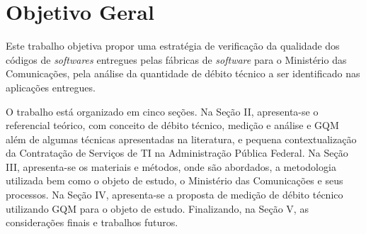 \section{Objetivo Geral}
 Este trabalho objetiva propor uma estratégia de verificação da qualidade dos
 códigos de \textit{softwares} entregues pelas fábricas de \textit{software} para o Ministério
 das Comunicações, pela análise da quantidade de débito técnico a ser identificado
 nas aplicações entregues.

 O trabalho está organizado em cinco seções. Na Seção II, apresenta-se o
 referencial teórico, com conceito de débito técnico, medição e análise e GQM
 além de algumas técnicas apresentadas na literatura, e pequena contextualização da Contratação de
 Serviços de TI na Administração Pública Federal. Na Seção III, apresenta-se
 os materiais e métodos, onde são abordados, a metodologia utilizada bem como o
 objeto de estudo, o Ministério das Comunicações e seus processos. Na Seção IV,
 apresenta-se a proposta de medição de débito técnico utilizando GQM para o objeto de estudo.
 Finalizando, na Seção V, as considerações finais e trabalhos futuros.
